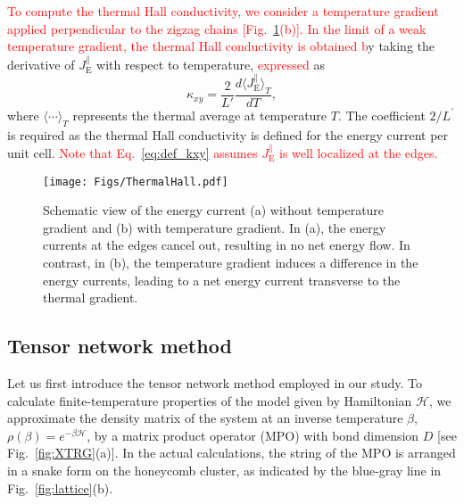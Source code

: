 \documentclass[twocolumn,superscriptaddress,showpacs, longbibliography, aps, prx]{revtex4-2}
\newcommand{\red}[1]{\textcolor{red}{#1}}
\begin{document}
\red{To compute the thermal Hall conductivity, we consider a temperature gradient applied perpendicular to the zigzag chains [Fig.~\ref{fig:ThermalHall}(b)]. 
In the limit of a weak temperature gradient, the thermal Hall conductivity is obtained 
b}y taking the derivative of $J_{\mathrm{E}}^{\parallel}$ with respect to temperature, %
\red{expressed} as 
\begin{equation}
 \kappa_{xy}=\frac{2}{L'} \frac{d \langle J_{\mathrm{E}}^{\parallel}\rangle_{T}}{d T},
\label{eq:def_kxy}
\end{equation}
where $\langle \cdots \rangle_T$ represents the thermal average at temperature $T$.
The coefficient $2/L^\prime$ is required as the thermal Hall conductivity is defined for the energy current per unit cell. 
\red{Note that Eq.~\eqref{eq:def_kxy} assumes $J_{\mathrm{E}}^\parallel$ is well localized at the edges.} 

\begin{figure}
  \begin{center}
    \texttt{[image: Figs/ThermalHall.pdf]}    
  \end{center}
  \caption{
    Schematic view of the energy current (a) without temperature gradient and (b) with temperature gradient. 
    In (a), the energy currents at the edges cancel out, resulting in no net energy flow. 
    In contrast, in (b), the temperature gradient induces a difference in the energy currents, leading to a net energy current transverse to the thermal gradient.
  }
  \label{fig:ThermalHall}
\end{figure}


\subsection{Tensor network method}\label{subsec:Tensor network method}
Let us first introduce the tensor network method employed in our study. 
To calculate finite-temperature properties of the model given by Hamiltonian $\mathcal{H}$, we approximate the density matrix of the system at an inverse temperature $\beta$, $\rho(\beta) = e^{-\beta\mathcal{H}}$, by a matrix product operator (MPO) with bond dimension $D$ [see Fig.~\ref{fig:XTRG}(a)]. In the actual calculations, the string of the MPO is arranged in a snake form on the honeycomb cluster, as indicated by the blue-gray line in Fig.~\ref{fig:lattice}(b). 
\end{document}
